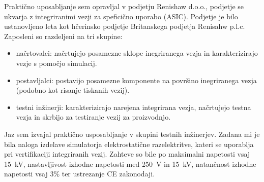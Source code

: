 \documentclass[a4paper,twoside,openright,12pt,slovene]{book}
\begin{document}
Praktično uposabljanje sem opravljal v podjetju Renishaw d.o.o., podjetje se ukvarja z integriranimi vezji za speficično uporabo (ASIC). Podjetje je bilo ustanovljeno leta kot hčerinsko podjetje Britanskega podjetja Renisahw p.l.c. Zaposleni so razdeljeni na tri skupine:
\begin{itemize}
	\item načrtovalci: načrtujejo posamezne sklope inegriranega vezja in karakterizirajo vezje s pomočjo simulacij.
	\item postavljalci: postavijo posamezne komponente na površino inegriranega vezja (podobno kot risanje tiskanih vezij).
	\item testni inžinerji: karakterizirajo narejena integrirana vezja, načrtujejo testna vezja in skrbijo za testiranje vezij za proizvodnjo.
\end{itemize}
Jaz sem izvajal praktično usposabljanje v skupini testnih inžinerjev. Zadana mi je bila naloga izdelave simulatorja elektrostatične razelektritve, kateri se uporablja pri vertifikaciji integriranih vezij. Zahteve so bile po maksimalni napetosti vsaj \SI{15}{\kilo\volt}, nastavljivost izhodne napetosti med \SI{250}{\volt} in \SI{15}{\kilo\volt}, natančnost izhodne napetosti vsaj 3\% ter ustrezanje CE zakonodaji. 
\end{document}
